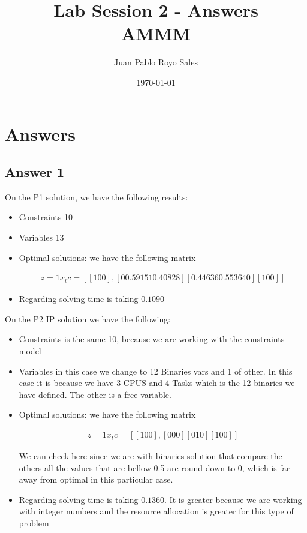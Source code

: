 \documentclass[12pt, a4paper]{article}
\title{
  Lab Session 2 - Answers \\
  AMMM
}
\author{Juan Pablo Royo Sales}
\date\today
\begin{document}
\begin{titlingpage}
  \maketitle
\end{titlingpage}

\section{Answers}
\subsection{Answer 1}\label{answer_1}

On the P1 solution, we have the following results:

\begin{itemize}
  \item Constraints 10
  \item Variables 13
  \item Optimal solutions: we have the following matrix

\begin{subequations}
  \begin{align}
    z = 1
    x_tc = [[1 0 0], [0 0.59151 0.40828] [0.44636 0.55364 0] [1 0 0]]
  \end{align}
\end{subequations}

 \item Regarding solving time is taking $0.1090$ 
\end{itemize}

On the P2 IP solution we have the following:

\begin{itemize}
\item Constraints is the same 10, because we are working with the constraints model
\item Variables in this case we change to 12 Binaries vars and 1 of other. In
  this case it is because we have 3 CPUS and 4 Tasks which is the 12 binaries we
  have defined. The other is a free variable.
  \item Optimal solutions: we have the following matrix

\begin{subequations}
  \begin{align}
    z = 1
    x_tc = [[1 0 0], [0 0 0] [0 1 0] [1 0 0]]
  \end{align}
\end{subequations}

We can check here since we are with binaries solution that compare the others
all the values that are bellow 0.5 are round down to 0, which is far away from
optimal in this particular case.

\item Regarding solving time is taking $0.1360$. It is greater because we are
  working with integer numbers and the resource allocation is greater for this
  type of problem 
\end{itemize}
\end{document}
